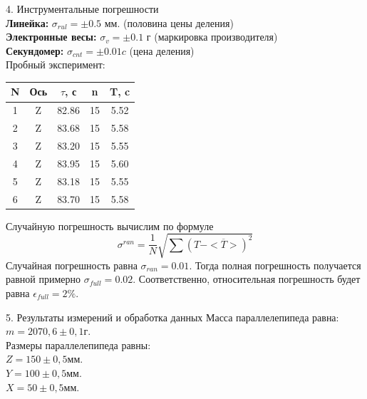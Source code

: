 \documentclass[12pt, a4paper]{article}
\begin{document}
\vspace{1cm}
{\Large 4. Инструментальные погрешности \\}
		\textbf{Линейка: } $\sigma_{rul} = \pm 0.5$ мм. (половина цены деления)\\
        \textbf{Электронные весы: } $\sigma_{v} = \pm 0.1$ г (маркировка производителя) \\
        \textbf{Секундомер: } $\sigma_{cnt} = \pm 0.01c$ (цена деления) \\
        \newpage
        Пробный эксперимент:
        \begin{center}
            \begin{tabular}{ | c | c | c | c | c | }
                \hline
                N & Ось & $\tau$, с & n & T, c \\ \hline
                1 & Z & 82.86 & 15 & 5.52 \\ \hline
                2 & Z & 83.68 & 15 & 5.58 \\ \hline
                3 & Z & 83.20 & 15 & 5.55 \\ \hline
                4 & Z & 83.95 & 15 & 5.60 \\ \hline
				5 & Z & 83.18 & 15 & 5.55 \\ \hline
				6 & Z & 83.70 & 15 & 5.58 \\ \hline
            \end{tabular}
            \end{center} 
		Случайную погрешность вычислим по формуле 
		\begin{displaymath}
			\sigma^{ran} = \frac{1}{N}\sqrt{\sum(T - <\overline{T}>)^2}
		\end{displaymath}
        Случайная погрешность равна $\sigma_{ran} = 0.01$.
        Тогда полная погрешность получается равной примерно $\sigma_{full} = 0.02$.
		Соответственно, относительная погрешность будет равна $\epsilon_{full} = 2\%$.

		\vspace{1cm}
        {\Large 5. Результаты измерений и обработка данных }
		Масса параллелепипеда равна: \\
		$m = 2070,6 \pm 0,1$г. \\
		Размеры параллелепипеда равны: \\
		$Z = 150 \pm 0,5$мм. \\
		$Y = 100 \pm 0,5$мм. \\
		$X = 50 \pm 0,5$мм. 
\end{document}
